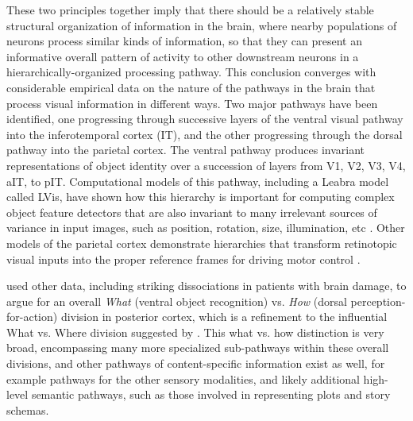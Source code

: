 \documentclass[11pt,twoside]{article}
\begin{document}
These two principles together imply that there should be a relatively stable
structural organization of information in the brain, where nearby populations
of neurons process similar kinds of information, so that they can present an
informative overall pattern of activity to other downstream neurons in a
hierarchically-organized processing pathway.  This conclusion converges with
considerable empirical data on the nature of the pathways in the brain that
process visual information in different ways.  Two major pathways have been
identified, one progressing through successive layers of the ventral visual
pathway into the inferotemporal cortex (IT), and the other progressing through
the dorsal pathway into the parietal cortex.  The ventral pathway produces
invariant representations of object identity over a succession of layers from
V1, V2, V3, V4, aIT, to pIT.  Computational models of this pathway, including
a Leabra model called LVis, have shown how this hierarchy is important
for computing complex object feature detectors that are also invariant to many
irrelevant sources of variance in input images, such as position, rotation,
size, illumination, etc \cite{OReillyEtAlIP,FreedmanRiesenhuberPoggioEtAl01,FreedmanRiesenhuberPoggioEtAl01b,FreedmanRiesenhuberPoggioEtAl02,FreedmanRiesenhuberPoggioEtAl03,GiesePoggio03,GiesePoggio03b}.  Other models of
the parietal cortex demonstrate hierarchies that transform retinotopic visual
inputs into the proper reference frames for driving motor control
\cite{PougetSejnowski97,PougetDeneveDuhamel02}.

 used other data, including striking dissociations in
patients with brain damage, to argue for an overall {\em What} (ventral object
recognition) vs. {\em How} (dorsal perception-for-action) division in
posterior cortex, which is a refinement to the influential What vs. Where
division suggested by .  This what vs. how
distinction is very broad, encompassing many more specialized sub-pathways
within these overall divisions, and other pathways of content-specific
information exist as well, for example pathways for the other sensory
modalities, and likely additional high-level semantic pathways, such as those
involved in representing plots and story schemas.
\end{document}
